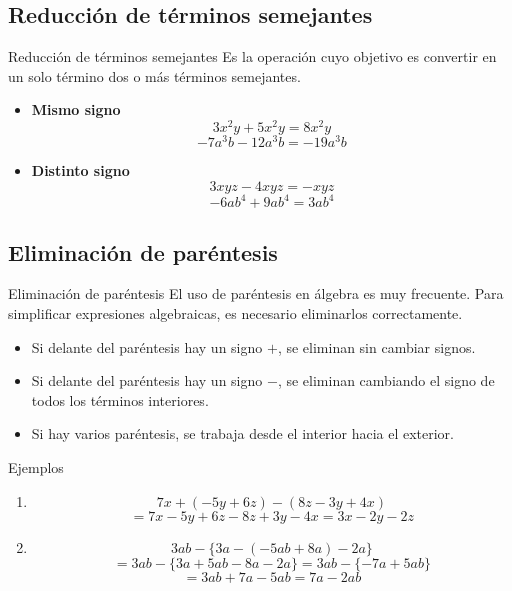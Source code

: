 \documentclass[10pt,handout,aspectratio=169]{beamer}
\begin{document}
	\subsection{Reducción de términos semejantes}
	
	\begin{frame}{Reducción de términos semejantes}
		Es la operación cuyo objetivo es convertir en un solo término dos o más términos semejantes.
		
		\begin{itemize}
			\item \textbf{Mismo signo}
			\[
			3x^{2}y+5x^{2}y=8x^{2}y
			\]
			\[
			-7a^{3}b-12a^{3}b=-19a^{3}b
			\]
			
			\item \textbf{Distinto signo}
			\[
			3xyz-4xyz=-xyz
			\]
			\[
			-6ab^{4}+9ab^{4}=3ab^{4}
			\]
		\end{itemize}
	\end{frame}
	
	\subsection{Eliminación de paréntesis}
	
	\begin{frame}{Eliminación de paréntesis}
		El uso de paréntesis en álgebra es muy frecuente. Para simplificar expresiones algebraicas, es necesario eliminarlos correctamente.
		
		\begin{itemize}
			\item Si delante del paréntesis hay un signo $+$, se eliminan sin cambiar signos.
			\item Si delante del paréntesis hay un signo $-$, se eliminan cambiando el signo de todos los términos interiores.
			\item Si hay varios paréntesis, se trabaja desde el interior hacia el exterior.
		\end{itemize}
		
		\begin{block}{Ejemplos}
			\begin{enumerate}
				\item 
				\[
				7x+(-5y+6z)-(8z-3y+4x)
				\]
				\[
				=7x-5y+6z-8z+3y-4x=3x-2y-2z
				\]
				
				\item
				\[
				3ab-\{3a-(-5ab+8a)-2a\}
				\]
				\[
				=3ab-\{3a+5ab-8a-2a\}
				=3ab-\{-7a+5ab\}
				\]
				\[
				=3ab+7a-5ab=7a-2ab
				\]
			\end{enumerate}
		\end{block}
	\end{frame}
	
\end{document}
